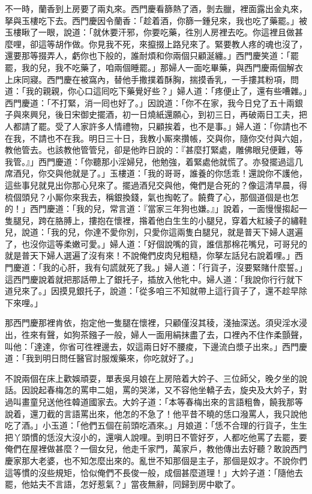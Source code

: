 不一時，蘭香到上房要了兩丸來。西門慶看篩熱了酒，剝去臘，裡面露出金丸來，拏與玉樓吃下去。西門慶因令蘭香：「趁着酒，你篩一鍾兒來，我也吃了藥罷。」被玉樓瞅了一眼，{}說道：「就休要汗邪，你要吃藥，徃別人房裡去吃。{}你這裡且做甚麼哩，卻這等胡作做。你見我不死，來攛掇上路兒來了。緊要教人疼的魂也沒了，還要那等掇弄人，虧你也下般的，誰耐煩和你兩個只顧涎纏。」西門慶笑道：「罷罷，我的兒，我不吃藥了，咱兩個睡罷。」那婦人一面吃畢藥，與西門慶兩個解衣上床同寢。西門慶在被窩內，替他手撒撲着酥胸，揣摸香乳，一手摟其粉項，問道：「我的親親，你心口這囘吃下藥覺好些？」{}婦人道：「疼便止了，還有些嘈雜。」西門慶道：「不打緊，消一囘也好了。」因說道：「你不在家，我今日兌了五十兩銀子與來興兒，後日宋御史擺酒，初一日燒紙還願心，到初三日，再破兩日工夫，把人都請了罷。受了人家許多人情禮物，只顧挨着，也不是事。」婦人道：「你請也不在我，不請也不在我。明日三十日，我教小厮來攢帳，交與你，隨你交付與六姐，教他管去。也該教他管管兒，卻是他昨日說的：『甚麼打緊處，雕佛眼兒便難，等我管。』」西門慶道：「你聽那小淫婦兒，他勉強，着緊處他就慌了。亦發擺過這几席酒兒，你交與他就是了。」{}玉樓道：「我的哥哥，誰養的你恁乖！還說你不護他，這些事兒就見出你那心兒來了。擺過酒兒交與他，俺們是合死的？像這清早晨，得梳個頭兒？小厮你來我去，稱銀換錢，氣也掏乾了。饒費了心，那個道個是也怎的！」{}西門慶道：「我的兒，常言道：『當家三年狗也嫌。』」說着，一面慢慢搊起一隻腿兒，{}跨在胳膊上，摟抱在懷裡，揝着他白生生的小腿兒，穿着大紅綾子的繡鞋兒，說道：「我的兒，你達不愛你別，只愛你這兩隻白腿兒，就是普天下婦人選遍了，也沒你這等柔嫩可愛。」{}婦人道：「好個說嘴的貨，誰信那棉花嘴兒，可哥兒的就是普天下婦人選遍了沒有來！不說俺們皮肉兒粗糙，你拏左話兒右說着哩。」西門慶道：「我的心肝，我有句謊就死了我。」婦人道：「行貨子，沒要緊賭什麼誓。」{}這西門慶說着就把那話帶上了銀托子，插放入他牝中。婦人道：「我說你行行就下道兒來了。」因摸見銀托子，說道：「從多咱三不知就帶上這行貨子了，還不趁早除下來哩。」

那西門慶那裡肯依，抱定他一隻腿在懷裡，只顧僅沒其稜，淺抽深送。須臾淫水浸出，徃來有聲，如狗茶鏹子一般，婦人一面用絹抹盡了去，口裡內不住作柔顫聲，叫他：「達達，你省可徃裡邊去，奴這兩日好不腰痠，下邊流白漿子出來。」西門慶道：「我到明日問任醫官討服煖藥來，你吃就好了。」

不說兩個在床上歡娛頑耍，單表吳月娘在上房陪着大妗子、三位師父，晚夕坐的說話。因說起春梅怎的罵申二姐，罵的哭涕，又不容他坐轎子去，旋央及大妗子，對過叫畫童兒送他徃韓道國家去。大妗子道：「本等春梅出來的言語粗魯，饒我那等說着，還刀截的言語罵出來，他怎的不急了！他平昔不曉的恁口潑罵人，我只說他吃了酒。」小玉道：「他們五個在前頭吃酒來。」月娘道：「恁不合理的行貨子，生生把丫頭慣的恁沒大沒小的，還嗔人說哩。到明日不管好歹，人都吃他罵了去罷，要俺們在屋裡做甚麼？{}一個女兒，他走千家門，萬家戶，教他傳出去好聽？敢說西門慶家那大老婆，也不知怎麼出來的。亂世不知那個是主子，那個是奴才。不說你們這等慣的沒些規矩，恰似俺們不長俊一般，成個甚麼道理！」大妗子道：「隨他去罷，他姑夫不言語，怎好惹氣？」當夜無辭，同歸到房中歇了。

